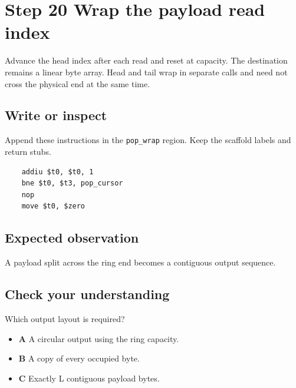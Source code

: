 \section{Step 20 Wrap the payload read index}\label{ring-s20}

Advance the head index after each read and reset at capacity. The destination remains a linear byte array. Head and tail wrap in separate calls and need not cross the physical end at the same time.

\subsection{Write or inspect}
Append these instructions in the \texttt{pop\_wrap} region. Keep the scaffold labels and return stubs.

\begin{verbatim}
    addiu $t0, $t0, 1
    bne $t0, $t3, pop_cursor
    nop
    move $t0, $zero
\end{verbatim}

\subsection{Expected observation}
A payload split across the ring end becomes a contiguous output sequence.

\subsection{Check your understanding}
Which output layout is required?

\begin{itemize}
  \item \textbf{A} A circular output using the ring capacity.
  \item \textbf{B} A copy of every occupied byte.
  \item \textbf{C} Exactly L contiguous payload bytes.
\end{itemize}
